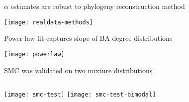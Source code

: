 \begin{frame}{$\alpha$ estimates are robust to phylogeny reconstruction method}
  \centerline{\texttt{[image: realdata-methods]}}
\end{frame}

\begin{frame}{Power law fit captures slope of BA degree distributions}
  \centerline{\texttt{[image: powerlaw]}}
\end{frame}

\begin{frame}{SMC was validated on two mixture distributions}
  \begin{columns}
    \texttt{[image: smc-test]}
    \texttt{[image: smc-test-bimodal]}
  \end{columns}
\end{frame}
